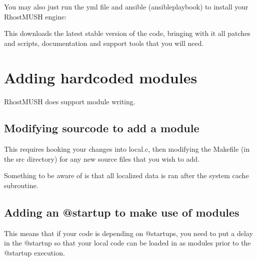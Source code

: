 \documentclass[letterpaper,10pt,english]{sphinxmanual}
\begin{document}
\begin{sphinxVerbatim}[commandchars=\\\{\}]
   
\end{sphinxVerbatim}

\sphinxAtStartPar
You may also just run the yml file and ansible (ansible\sphinxhyphen{}playbook) to install your RhostMUSH engine:

\begin{sphinxVerbatim}[commandchars=\\\{\}]
 
 
\end{sphinxVerbatim}

\sphinxAtStartPar
This downloads the latest stable version of the code, bringing with it all patches and scripts, documentation and support tools that you will need.


\section{Adding hardcoded modules}
\label{\detokenize{advanced:adding-hardcoded-modules}}
\sphinxAtStartPar
RhostMUSH does support module writing.


\subsection{Modifying sourcode to add a module}
\label{\detokenize{advanced:modifying-sourcode-to-add-a-module}}
\sphinxAtStartPar
This requires hooking your changes into local.c, then modifying the Makefile (in the src directory)
for any new source files that you wish to add.

\sphinxAtStartPar
Something to be aware of is that all localized data is ran after the system cache subroutine.


\subsection{Adding an @startup to make use of modules}
\label{\detokenize{advanced:adding-an-startup-to-make-use-of-modules}}
\sphinxAtStartPar
This means that if your code is depending on @startups, you need to put a delay in the @startup
so that your local code can be loaded in as modules prior to the @startup execution.
\end{document}
